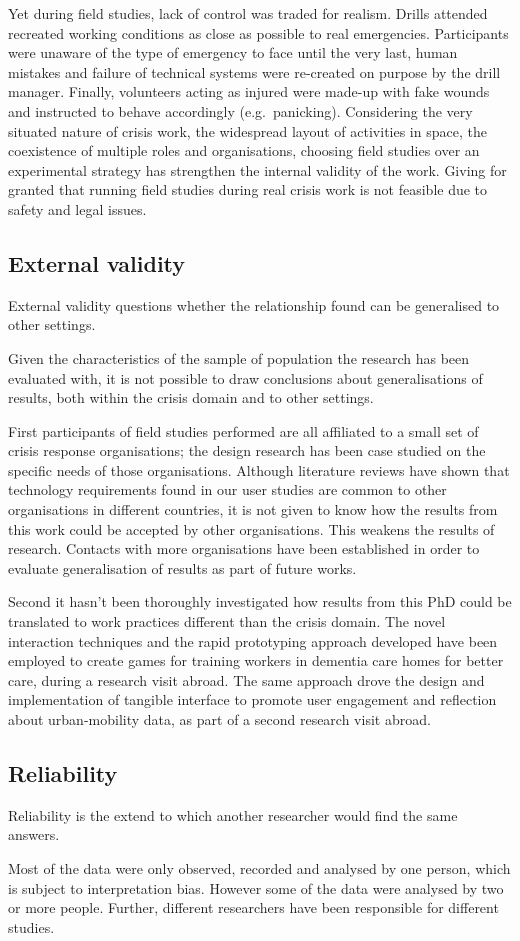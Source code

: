 Yet during field studies, lack of control was traded for realism. Drills attended recreated working conditions as close as possible to real emergencies. Participants were unaware of the type of emergency to face until the very last, human mistakes and failure of technical systems were re-created on purpose by the drill manager. Finally, volunteers acting as injured were made-up with fake wounds and instructed to behave accordingly (e.g.~panicking). Considering the very situated nature of crisis work, the widespread layout of activities in space, the coexistence of multiple roles and organisations, choosing field studies over an experimental strategy has strengthen the internal validity of the work. Giving for granted that running field studies during real crisis work is not feasible due to safety and legal issues.

\subsection{External validity}\label{external-validity}

External validity questions whether the relationship found can be generalised to other settings.

Given the characteristics of the sample of population the research has been evaluated with, it is not possible to draw conclusions about generalisations of results, both within the crisis domain and to other settings.

First participants of field studies performed are all affiliated to a small set of crisis response organisations; the design research has been case studied on the specific needs of those organisations. Although literature reviews have shown that technology requirements found in our user studies are common to other organisations in different countries, it is not given to know how the results from this work could be accepted by other organisations. This weakens the results of research. Contacts with more organisations have been established in order to evaluate generalisation of results as part of future works.

Second it hasn't been thoroughly investigated how results from this PhD could be translated to work practices different than the crisis domain. The novel interaction techniques and the rapid prototyping approach developed have been employed to create games for training workers in dementia care homes for better care, during a research visit abroad. The same approach drove the design and implementation of tangible interface to promote user engagement and reflection about urban-mobility data, as part of a second research visit abroad.

\subsection{Reliability}\label{reliability}

Reliability is the extend to which another researcher would find the same answers.

Most of the data were only observed, recorded and analysed by one person, which is subject to interpretation bias. However some of the data were analysed by two or more people. Further, different researchers have been responsible for different studies. 

